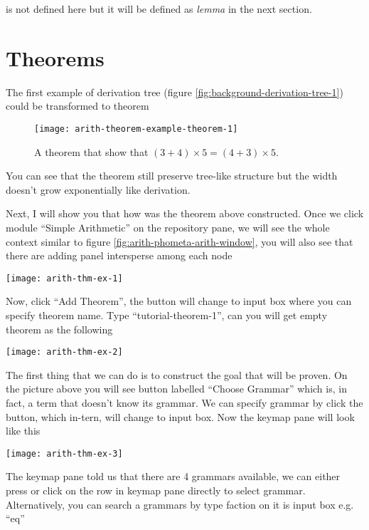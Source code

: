 \documentclass[master.tex]{subfiles}
\begin{document}
 is not defined here but it will be defined as \emph{lemma}
in the next section.

\section{Theorems}

The first example of derivation tree (figure
\ref{fig:background-derivation-tree-1}) could be transformed to theorem

\begin{figure}[H]
    \centering
\begin{minipage}{0.8\textwidth}
    \texttt{[image: arith-theorem-example-theorem-1]}
\end{minipage}
\caption{A theorem that show that $(3 + 4) \times 5 = (4 + 3) \times 5$.}
\label{fig:arith-theorem-example-theorem-1}
\end{figure}

You can see that the theorem still preserve tree-like structure but the width
doesn't grow exponentially like derivation.

Next, I will show you that how was the theorem above constructed. Once we click
module ``Simple Arithmetic'' on the repository pane, we will see the whole
context similar to figure \ref{fig:arith-phometa-arith-window}, you will also
see that there are adding panel intersperse among each node

\texttt{[image: arith-thm-ex-1]}

Now, click ``Add Theorem'', the button will change to input box where you can
specify theorem name. Type ``tutorial-theorem-1'', can you will get empty
theorem as the following

\texttt{[image: arith-thm-ex-2]}

The first thing that we can do is to construct the goal that will be proven. On
the picture above you will see button labelled ``Choose Grammar'' which is, in
fact, a term that doesn't know its grammar. We can specify grammar by click the
button, which in-tern, will change to input box. Now the keymap pane will look
like this

\begin{center}
\texttt{[image: arith-thm-ex-3]}
\end{center}

The keymap pane told us that there are 4 grammars available, we can either press
 or click on the row in keymap pane directly to select grammar.
Alternatively, you can search a grammars by type faction on it is input box e.g.
``eq''
\end{document}
